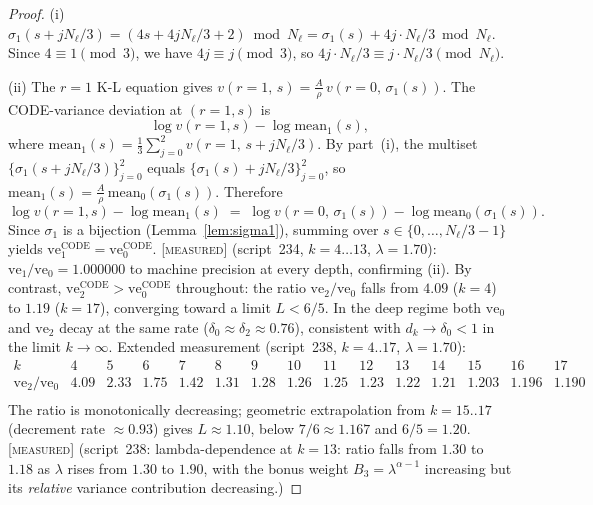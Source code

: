 \documentclass[11pt]{article}
\theoremstyle{definition}
\newcommand{\MEASURED}{\textup{[\textsc{measured}]}}
\begin{document}
\begin{proof}
(i) $\sigma_1(s + jN_\ell/3) = (4s + 4jN_\ell/3 + 2) \bmod N_\ell
= \sigma_1(s) + 4j\cdot N_\ell/3 \bmod N_\ell$.
Since $4 \equiv 1 \pmod{3}$, we have $4j \equiv j \pmod{3}$, so
$4j \cdot N_\ell/3 \equiv j \cdot N_\ell/3 \pmod{N_\ell}$.

(ii) The $r{=}1$ K-L equation gives $v(r{=}1,\,s) = \tfrac{A}{\rho}\,v(r{=}0,\,\sigma_1(s))$.
The CODE-variance deviation at $(r{=}1, s)$ is
\[
  \log v(r{=}1,s) - \log \mathrm{mean}_1(s),
\]
where $\mathrm{mean}_1(s) = \tfrac{1}{3}\sum_{j=0}^{2} v(r{=}1,\,s{+}jN_\ell/3)$.
By part~(i), the multiset $\{\sigma_1(s{+}jN_\ell/3)\}_{j=0}^{2}$
equals $\{\sigma_1(s){+}jN_\ell/3\}_{j=0}^{2}$,
so $\mathrm{mean}_1(s) = \tfrac{A}{\rho}\,\mathrm{mean}_0(\sigma_1(s))$.
Therefore
\[
  \log v(r{=}1,s) - \log\mathrm{mean}_1(s)
  \;=\; \log v(r{=}0,\,\sigma_1(s)) - \log\mathrm{mean}_0(\sigma_1(s)).
\]
Since $\sigma_1$ is a bijection (Lemma~\ref{lem:sigma1}), summing over
$s \in \{0,\ldots,N_\ell/3{-}1\}$ yields
$\mathrm{ve}_1^{\mathrm{CODE}} = \mathrm{ve}_0^{\mathrm{CODE}}$.
\MEASURED{} (script~234, $k{=}4\ldots13$, $\lambda = 1.70$): $\mathrm{ve}_1/\mathrm{ve}_0 =
1.000000$ to machine precision at every depth, confirming (ii).
By contrast, $\mathrm{ve}_2^{\mathrm{CODE}} > \mathrm{ve}_0^{\mathrm{CODE}}$ throughout:
the ratio $\mathrm{ve}_2/\mathrm{ve}_0$ falls from $4.09$ ($k{=}4$) to $1.19$
($k{=}17$), converging toward a limit $L < 6/5$.
In the deep regime both $\mathrm{ve}_0$ and $\mathrm{ve}_2$ decay at
the same rate ($\delta_0 \approx \delta_2 \approx 0.76$),
consistent with $d_k \to \delta_0 < 1$ in the limit $k \to \infty$.
Extended measurement (script~238, $k{=}4..17$, $\lambda{=}1.70$):
\[
\begin{array}{r|rrrrrrrrrrrrrr}
k & 4 & 5 & 6 & 7 & 8 & 9 & 10 & 11 & 12 & 13 & 14 & 15 & 16 & 17 \\
\hline
\mathrm{ve}_2/\mathrm{ve}_0 & 4.09 & 2.33 & 1.75 & 1.42 & 1.31 & 1.28 & 1.26 & 1.25 & 1.23 & 1.22 & 1.21 & 1.203 & 1.196 & 1.190 \\
\end{array}
\]
The ratio is monotonically decreasing; geometric extrapolation from
$k{=}15..17$ (decrement rate $\approx 0.93$) gives $L \approx 1.10$,
below $7/6 \approx 1.167$ and $6/5 = 1.20$.
\MEASURED{} (script~238: lambda-dependence at $k{=}13$: ratio falls from
$1.30$ to $1.18$ as $\lambda$ rises from $1.30$ to $1.90$, with the
bonus weight $B_3 = \lambda^{\alpha-1}$ increasing but its \emph{relative}
variance contribution decreasing.)
\end{proof}
\end{document}
